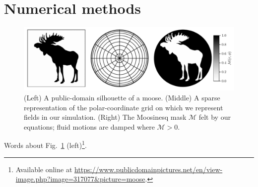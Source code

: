 \section{Numerical methods}
\label{sec:methods}

\begin{figure}[t!]
\centering
\includegraphics[width=\textwidth]{paper_figure01.pdf}
    \caption{ 
        (Left) A public-domain silhouette of a moose.
        (Middle) A sparse representation of the polar-coordinate grid on which we represent fields in our simulation.
        (Right) The Moosinesq mask $\mathcal{M}$ felt by our equations; fluid motions are damped where $\mathcal{M} > 0$.
        \label{fig:methods}
    }
\end{figure}

Words about Fig.~\ref{fig:methods} (left)\footnote{Available online at \url{https://www.publicdomainpictures.net/en/view-image.php?image=317077&picture=moose}.}.
